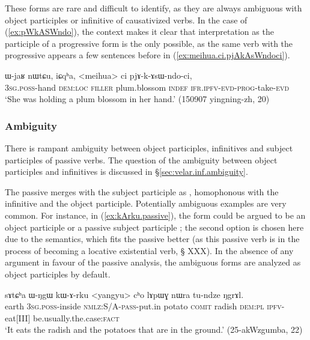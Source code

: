 These forms are rare and difficult to identify, as they are always ambiguous with object participles or infinitive of causativized verbs. In the case of (\ref{ex:pWkASWndo}), the context makes it clear that interpretation as the participle of a progressive form is the only possible, as the same verb with the progressive appears a few sentences before in (\ref{ex:meihua.ci.pjAkAsWndoci}).

\begin{exe}
\ex  \label{ex:meihua.ci.pjAkAsWndoci}
\gll   ɯ-jaʁ nɯtɕu, iɕqʰa, <meihua> ci pjɤ-k-ɤsɯ-ndo-ci, \\
\textsc{3sg}.\textsc{poss}-hand \textsc{dem}:\textsc{loc} \textsc{filler} plum.blossom \textsc{indef} \textsc{ifr}.\textsc{ipfv}-\textsc{evd}-\textsc{prog}-take-\textsc{evd} \\
 \glt `She was holding a plum blossom in her hand.' (150907 yingning-zh, 20)
\end{exe}

\subsubsection{Ambiguity} \label{sec:object.participle.ambiguity}
There is rampant ambiguity between object participles,  infinitives and subject participles of passive verbs.  The question of the ambiguity between object participles and  infinitives is discussed in §\ref{sec:velar.inf.ambiguity}.

The passive  merges with the subject participle as , homophonous with the infinitive and the object participle. Potentially ambiguous examples are very common. For instance, in (\ref{ex:kArku.passive}), the form  could be argued to be an object participle  or a passive subject participle ; the second option is chosen here due to the semantics, which fits the passive  better (as this passive verb is in the process of becoming a locative existential verb, § XXX). In the absence of any argument in favour of the passive analysis, the ambiguous  forms are analyzed as object participles by default.

\begin{exe}
\ex \label{ex:kArku.passive}
 \gll  sɤtɕʰa ɯ-ŋgɯ kɯ-ɤ-rku <yangyu> cʰo lɤpɯɣ nɯra tu-ndze ŋgrɤl. \\
 earth \textsc{3sg}.\textsc{poss}-inside \textsc{nmlz}:S/A-\textsc{pass}-put.in potato \textsc{comit} radish \textsc{dem}:\textsc{pl} \textsc{ipfv}-eat[III] be.usually.the.case:\textsc{fact} \\
 \glt `It eats the radish and the potatoes that are in the ground.' (25-akWzgumba, 22)
\end{exe}

